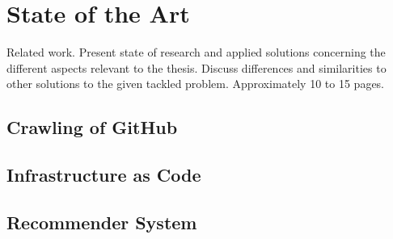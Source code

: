 \chapter{State of the Art}
Related work. Present state of research and applied solutions concerning the different aspects relevant to the thesis. Discuss differences and similarities to other solutions to the given tackled problem. Approximately 10 to 15 pages.

\section{Crawling of GitHub}
\section{Infrastructure as Code}
\section{Recommender System}